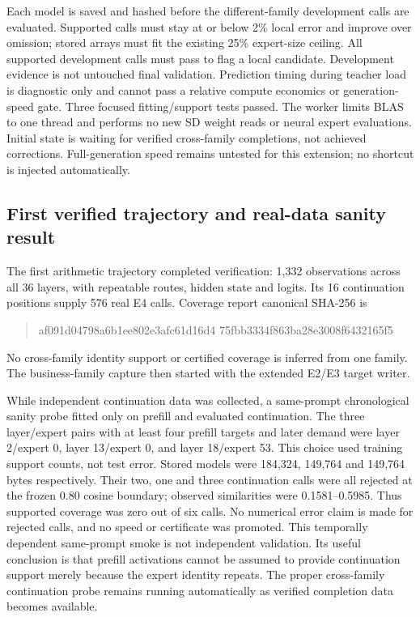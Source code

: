 Each model is saved and hashed before the different-family development calls
are evaluated. Supported calls must stay at or below 2\% local error and
improve over omission; stored arrays must fit the existing 25\% expert-size
ceiling. All supported development calls must pass to flag a local candidate.
Development evidence is not untouched final validation. Prediction timing
during teacher load is diagnostic only and cannot pass a relative compute
economics or generation-speed gate. Three focused fitting/support tests passed.
The worker limits BLAS to one thread and performs no new SD weight reads or
neural expert evaluations. Initial state is waiting for verified cross-family
completions, not achieved corrections. Full-generation speed remains untested
for this extension; no shortcut is injected automatically.

\subsection{First verified trajectory and real-data sanity result}
The first arithmetic trajectory completed verification: 1,332 observations
across all 36 layers, with repeatable routes, hidden state and logits. Its
16 continuation positions supply 576 real E4 calls. Coverage report canonical
SHA-256 is
\begin{quote}\ttfamily\small
af091d04798a6b1ee802e3afc61d16d4\allowbreak
75fbb3334f863ba28e3008f6432165f5
\end{quote}
No cross-family identity support or certified coverage is inferred from one
family. The business-family capture then started with the extended E2/E3
target writer.

While independent continuation data was collected, a same-prompt chronological
sanity probe fitted only on prefill and evaluated continuation. The three
layer/expert pairs with at least four prefill targets and later demand were
layer 2/expert 0, layer 13/expert 0, and layer 18/expert 53. This choice used
training support counts, not test error. Stored models were 184,324, 149,764
and 149,764 bytes respectively. Their two, one and three continuation calls
were all rejected at the frozen 0.80 cosine boundary; observed similarities
were 0.1581--0.5985. Thus supported coverage was zero out of six calls.
No numerical error claim is made for rejected calls, and no speed or certificate
was promoted. This temporally dependent same-prompt smoke is not independent
validation. Its useful conclusion is that prefill activations cannot be assumed
to provide continuation support merely because the expert identity repeats.
The proper cross-family continuation probe remains running automatically as
verified completion data becomes available.

